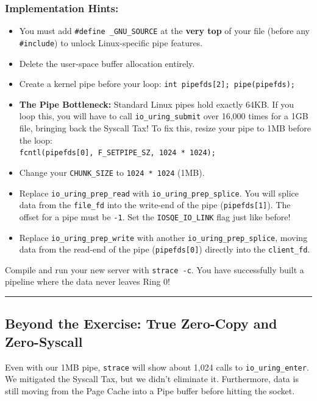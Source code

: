 \documentclass[11pt, a4paper]{article}
\begin{document}
\subsubsection*{Implementation Hints:}
\begin{itemize}
    \item You must add \texttt{\#define \_GNU\_SOURCE} at the \textbf{very top} of your file (before any \texttt{\#include}) to unlock Linux-specific pipe features.
    \item Delete the user-space buffer allocation entirely.
    \item Create a kernel pipe before your loop: \texttt{int pipefds[2]; pipe(pipefds);}
    \item \textbf{The Pipe Bottleneck:} Standard Linux pipes hold exactly 64KB. If you loop this, you will have to call \texttt{io\_uring\_submit} over 16,000 times for a 1GB file, bringing back the Syscall Tax! To fix this, resize your pipe to 1MB before the loop: \\
    \texttt{fcntl(pipefds[0], F\_SETPIPE\_SZ, 1024 * 1024);}
    \item Change your \texttt{CHUNK\_SIZE} to \texttt{1024 * 1024} (1MB). 
    \item Replace \texttt{io\_uring\_prep\_read} with \texttt{io\_uring\_prep\_splice}. You will splice data from the \texttt{file\_fd} into the write-end of the pipe (\texttt{pipefds[1]}). The offset for a pipe must be \texttt{-1}. Set the \texttt{IOSQE\_IO\_LINK} flag just like before!
    \item Replace \texttt{io\_uring\_prep\_write} with another \texttt{io\_uring\_prep\_splice}, moving data from the read-end of the pipe (\texttt{pipefds[0]}) directly into the \texttt{client\_fd}.
\end{itemize}

Compile and run your new server with \texttt{strace -c}. You have successfully built a pipeline where the data never leaves Ring 0!

\vspace{0.5cm}
\hrule
\vspace{0.5cm}

\subsection*{Beyond the Exercise: True Zero-Copy and Zero-Syscall}
Even with our 1MB pipe, \texttt{strace} will show about 1,024 calls to \texttt{io\_uring\_enter}. We mitigated the Syscall Tax, but we didn't eliminate it. Furthermore, data is still moving from the Page Cache into a Pipe buffer before hitting the socket. 
\end{document}
